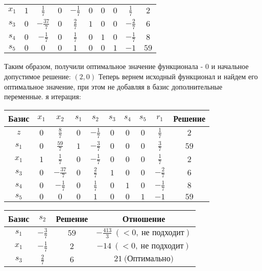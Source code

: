 \documentclass{article}%
\begin{document}
\begin{flushleft}
\begin{tabular}{|c|cccccccc|c|}
$x_{1}$&$1$&$\frac{1}{7}$&$0$&$-\frac{1}{7}$&$0$&$0$&$0$&$\frac{1}{7}$&$2$\\%
$s_{3}$&$0$&$-\frac{37}{7}$&$0$&$\frac{2}{7}$&$1$&$0$&$0$&$-\frac{2}{7}$&$6$\\%
$s_{4}$&$0$&$-\frac{1}{7}$&$0$&$\frac{1}{7}$&$0$&$1$&$0$&$-\frac{1}{7}$&$8$\\%
$s_{5}$&$0$&$0$&$0$&$1$&$0$&$0$&$1$&$-1$&$59$\\%
\hline%
\end{tabular}%
\newline%
\newline%
Таким образом, получили оптимальное значение функционала {-} 0 и начальное допустимое решение: %
$(2, 0)$%
\newline%
Теперь вернем исходный функционал и найдем его оптимальное значение, при этом не добавляя в базис дополнительные переменные.%
я итерация: %
\newline%
\newline%
\renewcommand{\arraystretch}{1.3}%
\begin{tabular}{|c|cccccccc|c|}%
\hline%
Базис&$x_{1}$&$x_{2}$&$s_{1}$&$s_{2}$&$s_{3}$&$s_{4}$&$s_{5}$&$r_{1}$&Решение\\%
\hline%
$z$&$0$&$\frac{8}{7}$&$0$&$-\frac{1}{7}$&$0$&$0$&$0$&$\frac{1}{7}$&$2$\\%
\hline%
$s_{1}$&$0$&$\frac{59}{7}$&$1$&$-\frac{3}{7}$&$0$&$0$&$0$&$\frac{3}{7}$&$59$\\%
$x_{1}$&$1$&$\frac{1}{7}$&$0$&$-\frac{1}{7}$&$0$&$0$&$0$&$\frac{1}{7}$&$2$\\%
$s_{3}$&$0$&$-\frac{37}{7}$&$0$&$\frac{2}{7}$&$1$&$0$&$0$&$-\frac{2}{7}$&$6$\\%
$s_{4}$&$0$&$-\frac{1}{7}$&$0$&$\frac{1}{7}$&$0$&$1$&$0$&$-\frac{1}{7}$&$8$\\%
$s_{5}$&$0$&$0$&$0$&$1$&$0$&$0$&$1$&$-1$&$59$\\%
\hline%
\end{tabular}%
\newline%
\newline%
\newline%
\begin{tabular}{|cccc|}%
\hline%
Базис&$s_{2}$&Решение&Отношение\\%
\hline%
$s_{1}$&$-\frac{3}{7}$&$59$&$-\frac{413}{3}\: (< 0, \: \text{не подходит})$\\%
$x_{1}$&$-\frac{1}{7}$&$2$&$-14\: (< 0, \: \text{не подходит})$\\%
$s_{3}$&$\frac{2}{7}$&$6$&$21\: \text{(Оптимально)}$\\%

\end{tabular}
\end{flushleft}
\end{document}
